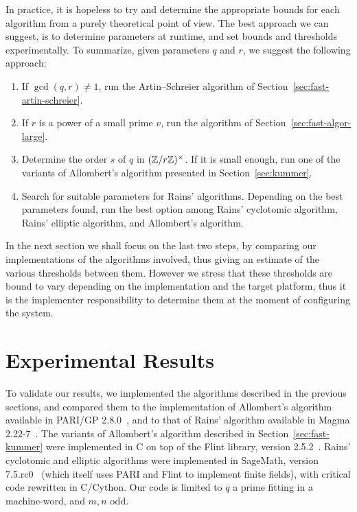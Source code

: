 In practice, it is hopeless to try and determine the appropriate
bounds for each algorithm from a purely theoretical point of view. The
best approach we can suggest, is to determine parameters at runtime,
and set bounds and thresholds experimentally.
To summarize, given parameters $q$ and $r$, we suggest
the following approach:
\begin{enumerate}
\item If $\gcd(q,r)\ne 1$, run the Artin--Schreier algorithm of
  Section~\ref{sec:fast-artin-schreier}.
\item If $r$ is a power of a small prime $v$, run the algorithm of
  Section~\ref{sec:fast-algor-large}.
\item Determine the order $s$ of $q$ in $(\mathbb{Z}/r\mathbb{Z})^\times$. If it is
  small enough, run one of the variants of Allombert's algorithm
  presented in Section~\ref{sec:kummer}.
\item Search for suitable parameters for Rains' algorithms. %
  Depending on the best parameters found, run the best option among
  Rains' cyclotomic algorithm, Rains' elliptic algorithm, and
  Allombert's algorithm.
\end{enumerate}

In the next section we shall focus on the last two steps, by comparing
our implementations of the
algorithms involved, thus giving an estimate of the various thresholds
between them.  However we stress that these thresholds are bound to
vary depending on the implementation and the target platform, thus it
is the implementer responsibility to determine them at the moment of
configuring the system.


\section{Experimental Results}
\label{sec:experimental-results}

To validate our results, we implemented the algorithms described in
the previous sections, and compared them to the implementation of
Allombert's algorithm available in PARI/GP 2.8.0~\cite{Pari}, and to
that of Rains' algorithm available in Magma 2.22-7~\cite{MAGMA}. %
The variants of Allombert's algorithm described in
Section~\ref{sec:fast-kummer} were implemented in C on top of the
Flint library, version 2.5.2~\cite{hart2010flint}. %
Rains' cyclotomic and elliptic algorithms were implemented in
SageMath, version 7.5.rc0~\cite{Sage} (which itself uses PARI and
Flint to implement finite fields), with critical code rewritten in
C/Cython. %
Our code is limited to $q$ a prime fitting in a machine-word, and
$m,n$ odd.

